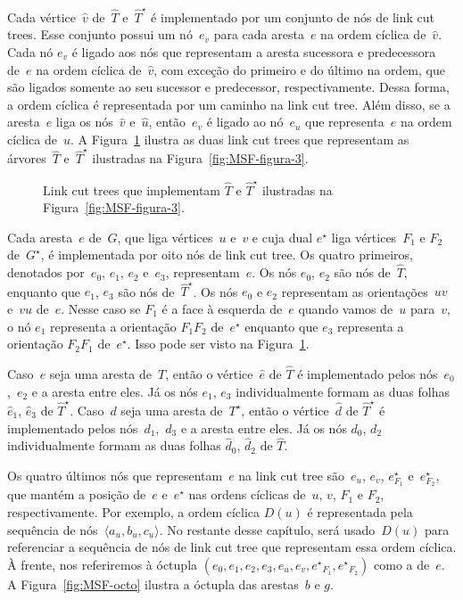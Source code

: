 Cada vértice~$\hat v$ de~$\hat T$ e~$\hat T^\star$ é implementado por um conjunto de nós de link cut trees.
Esse conjunto possui um nó~$e_v$ para cada aresta~$e$ na ordem cíclica de~$\hat v$.
Cada nó $e_v$ é ligado aos nós que representam a aresta sucessora e predecessora de~$e$ na ordem cíclica de~$\hat v$,
com exceção do primeiro e do último na ordem, que são ligados somente ao seu sucessor e predecessor, respectivamente.
Dessa forma, a ordem cíclica é representada por um caminho na link cut tree.
Além disso, se a aresta~$e$ liga os nós~$\hat v$ e~$\hat u$, então~$e_v$ é ligado ao nó~$e_u$ que representa~$e$ na ordem cíclica de~$\hat u$.
A Figura~\ref{fig:MSF-figura-4} ilustra as duas link cut trees que representam as árvores~$\hat T$ e~$\hat T^\star$ ilustradas na Figura~\ref{fig:MSF-figura-3}.

\begin{figure}[htb]
\scalebox{1.3}{
\centering

}
\caption{Link cut trees que implementam $\hat T$ e $\hat T^\star$ ilustradas na Figura~\ref{fig:MSF-figura-3}.}
\label{fig:MSF-figura-4}
\end{figure}

Cada aresta~$e$ de~$G$, que liga vértices~$u$ e~$v$ e cuja dual $e^\star$ liga vértices~$F_1$ e $F_2$ de~$G^\star$, é implementada por oito nós de link cut tree.
Os quatro primeiros, denotados por~$e_0$, $e_1$, $e_2$ e~$e_3$, representam~$e$.
Os nós $e_0$, $e_2$ são nós de~$\hat T$, enquanto que $e_1$, $e_3$ são nós de~$\hat T^\star$.
Os nós $e_0$ e $e_2$ representam as orientações~$uv$ e~$vu$ de~$e$.
Nesse caso se $F_1$ é a face à esquerda de~$e$ quando vamos de~$u$ para~$v$, o nó $e_1$ representa a orientação $F_1F_2$ de~$e^\star$ enquanto que $e_3$ representa a orientação $F_2F_1$ de~$e^\star$.
Isso pode ser visto na Figura~\ref{fig:MSF-figura-4}.

Caso~$e$ seja uma aresta de~$T$, então o vértice~$\hat e$ de $\hat T$ é implementado pelos nós~$e_0$,~$e_2$ e a aresta entre eles.
Já os nós $e_1$, $e_3$ individualmente formam as duas folhas $\hat e_1$, $\hat e_3$ de $\hat T^\star$.
Caso~$d$ seja uma aresta de~$T^\star$, então o vértice~$\hat d$ de $\hat T^\star$ é implementado pelos nós~$d_1$,~$d_3$ e a aresta entre eles.
Já os nós $d_0$, $d_2$ individualmente formam as duas folhas $\hat d_0$, $\hat d_2$ de $\hat T$.

Os quatro últimos nós que representam~$e$ na link cut tree são~$e_u$, $e_v$, $e^\star_{F_1}$ e~$e^\star_{F_2}$, que mantém a posição de~$e$ e~$e^\star$ nas ordens cíclicas de~$u$, $v$, $F_1$ e $F_2$, respectivamente.
Por exemplo, a ordem cíclica $D(u)$ é representada pela sequência de nós~$\langle a_u, b_u, c_u\rangle$.
No restante desse capítulo, será usado~$D(u)$ para referenciar a sequência de nós de link cut tree que representam essa ordem cíclica.
À frente, nos referiremos à óctupla $( e_0, e_1, e_2, e_3, e_u, e_v, {e^\star}_{F_1}, {e^\star}_{F_2})$ como a  de~$e$.
A Figura~\ref{fig:MSF-octo} ilustra a óctupla das arestas~$b$ e $g$.


